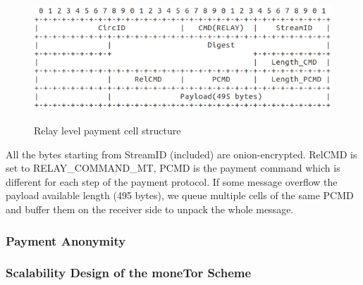 \begin{figure}[h]
	\centering
	\includegraphics[scale=0.38]{images/payment_cell_header.png}
	\label{fig:relay_command_mt_structure}
	\caption{Relay level payment cell structure}
\end{figure}

All the bytes starting from StreamID (included) are onion-encrypted. RelCMD is set to RELAY\_COMMAND\_MT, PCMD is the payment command which is different for each step of the payment protocol. If some message overflow the payload available length (495 bytes), we queue multiple cells of the same PCMD and buffer them on the receiver side to unpack the whole message.

\subsubsection{Payment Anonymity}


\subsubsection{Scalability Design of the moneTor Scheme}

